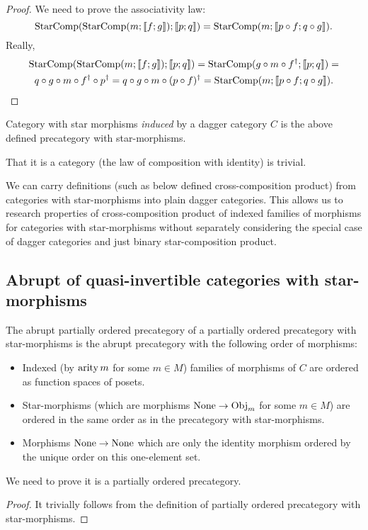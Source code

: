 \begin{proof}
We need to prove the associativity law: 
\[
\operatorname{StarComp}(\operatorname{StarComp}(m;\llbracket f;g\rrbracket);\llbracket p;q\rrbracket)=\operatorname{StarComp}(m;\llbracket p\circ f;q\circ g\rrbracket).
\]
Really,
\begin{multline*}
\operatorname{StarComp}(\operatorname{StarComp}(m;\llbracket f;g\rrbracket);\llbracket p;q\rrbracket)=\operatorname{StarComp}(g\circ m\circ f^{\dagger};\llbracket p;q\rrbracket)=\\
q\circ g\circ m\circ f^{\dagger}\circ p^{\dagger}=q\circ g\circ m\circ(p\circ f)^{\dagger}=\operatorname{StarComp}(m;\llbracket p\circ f;q\circ g\rrbracket).
\end{multline*}
\end{proof}
\begin{defn}
Category
with star morphisms \emph{induced} by a dagger category $C$ is the
above defined precategory with star-morphisms.
\end{defn}
That it is a category (the law of composition with identity) is trivial.
\begin{rem}
We can carry definitions (such as below defined cross-composition
product) from categories with star-morphisms into plain dagger categories.
This allows us to research properties of cross-composition product
of indexed families of morphisms for categories with star-morphisms
without separately considering the special case of dagger categories
and just binary star-composition product.
\end{rem}

\subsection{Abrupt of quasi-invertible categories with star-morphisms}
\begin{defn}
The abrupt partially ordered precategory of a partially ordered precategory
with star-morphisms is the abrupt precategory with the following order
of morphisms: 
\begin{itemize}
\item Indexed (by $\operatorname{arity} m$ for some $m\in M$) families of morphisms
of $C$ are ordered as function spaces of posets.
\item Star-morphisms (which are morphisms $\operatorname{None}\rightarrow\operatorname{Obj}_{m}$ for
some $m\in M$) are ordered in the same order as in the precategory
with star-morphisms.
\item Morphisms $\operatorname{None}\rightarrow\operatorname{None}$ which are only the identity morphism
ordered by the unique order on this one-element set. 
\end{itemize}
\end{defn}
We need to prove it is a partially ordered precategory.
\begin{proof}
It trivially follows from the definition of partially ordered precategory
with star-morphisms.
\end{proof}

